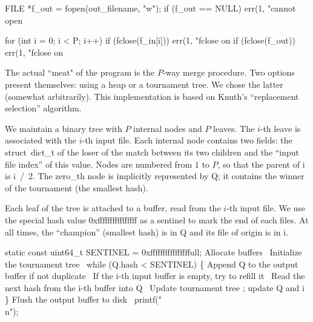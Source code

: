 \documentclass{article}%
\begin{document}
FILE *f_out = fopen(out_filename, "w");
if (f_out == NULL)
        err(1, "cannot open %

\nwendcode{}\endmoddef\nwstartdeflinemarkup{}\nwenddeflinemarkup
for (int i = 0; i < P; i++)
        if (fclose(f_in[i]))
                err(1, "fclose on %
if (fclose(f_out))
        err(1, "fclose on %


\nwendcode{}The actual ``meat" of the program is the $P$-way merge procedure. Two
options present themselves: using a heap or a tournament tree. We chose the
latter (somewhat arbitrarily). This implementation is based on Knuth's
``replacement selection'' algorithm.

We maintain a binary tree with $P$ internal nodes and $P$ leaves. The $i$-th
leave is associated with the $i$-th input file. Each internal node contains
two fields: the {\Tt{}struct\ dict{\_}t\nwendquote} of the loser of the match between its two
children and the ``input file index'' of this value. Nodes are numbered from
$1$ to $P$, so that the parent of {\Tt{}i\nwendquote} is {\Tt{}i\ /\ 2\nwendquote}. The zero_th node is
implicitly represented by {\Tt{}Q\nwendquote}; it contains the winner of the tournament (the
smallest hash).

Each leaf of the tree is attached to a buffer, read from the $i$-th input
file. We use the special hash value {\Tt{}0xffffffffffffffff\nwendquote} as a sentinel to mark
the end of each files. At all times, the ``champion'' (smallest hash) is in
{\Tt{}Q\nwendquote} and its file of origin is in {\Tt{}i\nwendquote}.

\nwenddocs{}\endmoddef\nwstartdeflinemarkup{}\nwenddeflinemarkup
static const uint64_t SENTINEL = 0xffffffffffffffffull;
\LA{}Allocate buffers~{\nwtagstyle{}}\RA{}
\LA{}Initialize the tournament tree~{\nwtagstyle{}}\RA{}
while (Q.hash < SENTINEL) \{
        \LA{}Append \code{}Q\edoc{} to the output buffer if not duplicate~{\nwtagstyle{}}\RA{}
        \LA{}If the \code{}i\edoc{}-th input buffer is empty, try to refill it~{\nwtagstyle{}}\RA{}
        \LA{}Read the next hash from the \code{}i\edoc{}-th buffer into \code{}Q\edoc{}~{\nwtagstyle{}}\RA{}
        \LA{}Update tournament tree ; update \code{}Q\edoc{} and \code{}i\edoc{}~{\nwtagstyle{}}\RA{}
\}
\LA{}Flush the output buffer to disk~{\nwtagstyle{}}\RA{}
printf("\\n");
\end{document}
